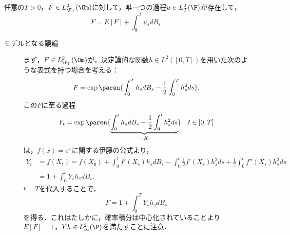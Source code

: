 \documentclass[uplatex,dvipdfmx]{jsreport}
\begin{document}
\begin{theorem}
    \label{thm-integral-representation-for-L2-rv}
    任意の$T>0$，$F\in L^2_{\F_T}(\Om)$に対して，唯一つの過程$u\in L^2_T(\P)$が存在して，
    \[F=E[F]+\int^T_0u_sdB_s.\]
\end{theorem}
\begin{Proof}\mbox{}
    \begin{description}
        \item[モデルとなる議論] まず，$F\in L^2_{\F_T}(\Om)$が，決定論的な関数$h\in L^2([0,T])$を用いた次のような表式を持つ場合を考える：
        \[F=\exp\paren{\int^T_0h_sdB_s-\frac{1}{2}\int^T_0h^2_sds}.\]
        この$F$に至る過程
        \[Y_t=\exp\paren{\underbrace{\int^t_0h_sdB_s-\frac{1}{2}\int^t_0h^2_sds}_{=:X_t}}\quad t\in[0,T]\]
        は，$f(x)=e^x$に関する伊藤の公式より，
        \begin{align*}
            Y_t&=f(X_t)=f(X_0)+\int^t_0f'(X_s)h_sdB_s-\int^t_0\frac{1}{2}f'(X_s)h_s^2ds+\frac{1}{2}\int^t_0f''(X_s)h^2_sds\\
            &=1+\int^t_0Y_sh_sdB_s.
        \end{align*}
        $t=T$を代入することで，
        \[F=1+\int^T_0Y_sh_sdB_s\]
        を得る．これはたしかに，確率積分は中心化されていることより$E[F]=1$，$Yh\in L^2_\infty(\P)$を満たすことに注意．


\end{description}
\end{Proof}
\end{document}
